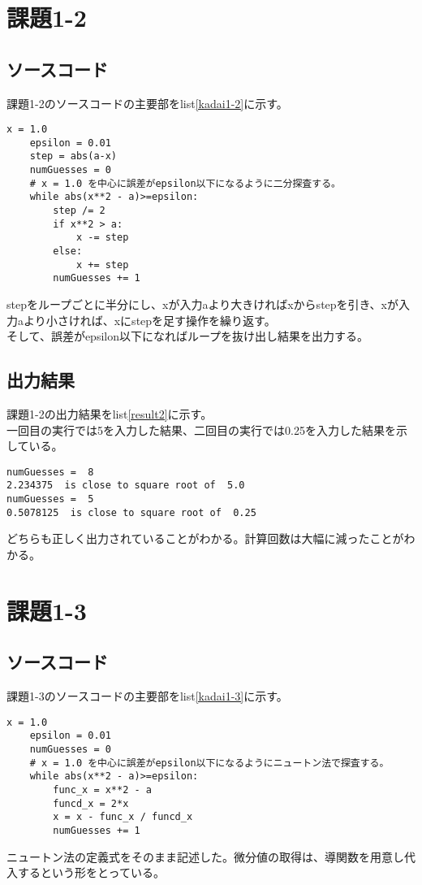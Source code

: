 \documentclass{ltjsarticle}
\begin{document}
\section*{課題1-2}
\subsection*{ソースコード}
課題1-2のソースコードの主要部をlist\ref{kadai1-2}に示す。
\begin{lstlisting}[caption=kadai1-2.py,label=kadai1-2]
    x = 1.0
    epsilon = 0.01
    step = abs(a-x)
    numGuesses = 0
    # x = 1.0 を中心に誤差がepsilon以下になるように二分探査する。
    while abs(x**2 - a)>=epsilon:
        step /= 2
        if x**2 > a:
            x -= step
        else:
            x += step
        numGuesses += 1
\end{lstlisting}
stepをループごとに半分にし、xが入力aより大きければxからstepを引き、xが入力aより小さければ、xにstepを足す操作を繰り返す。
\\そして、誤差がepsilon以下になればループを抜け出し結果を出力する。

\subsection*{出力結果}
課題1-2の出力結果をlist\ref{result2}に示す。
\\一回目の実行では5を入力した結果、二回目の実行では0.25を入力した結果を示している。
\begin{lstlisting}[caption=output, label=result2]
numGuesses =  8
2.234375  is close to square root of  5.0
numGuesses =  5
0.5078125  is close to square root of  0.25
\end{lstlisting}
どちらも正しく出力されていることがわかる。計算回数は大幅に減ったことがわかる。
\newpage

\section*{課題1-3}
\subsection*{ソースコード}
課題1-3のソースコードの主要部をlist\ref{kadai1-3}に示す。
\begin{lstlisting}[caption=kadai1-3.py,label=kadai1-3]
    x = 1.0
    epsilon = 0.01
    numGuesses = 0
    # x = 1.0 を中心に誤差がepsilon以下になるようにニュートン法で探査する。
    while abs(x**2 - a)>=epsilon:
        func_x = x**2 - a
        funcd_x = 2*x
        x = x - func_x / funcd_x
        numGuesses += 1
\end{lstlisting}
ニュートン法の定義式をそのまま記述した。微分値の取得は、導関数を用意し代入するという形をとっている。
\end{document}
